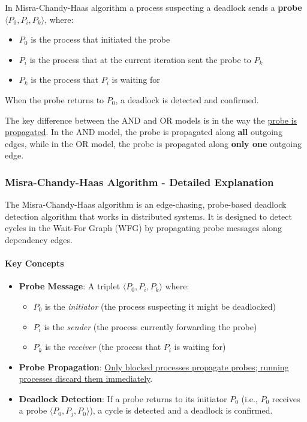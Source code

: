 In Misra-Chandy-Haas algorithm a process suspecting a deadlock sends a \textbf{probe} $\langle P_0,P_i,P_k\rangle$, where:
\begin{itemize}
   \item $P_0$ is the process that initiated the probe
   \item $P_i$ is the process that at the current iteration sent the probe to $P_k$
   \item $P_k$ is the process that $P_i$ is waiting for
\end{itemize}
When the probe returns to $P_0$, a deadlock is detected and confirmed.

The key difference between the AND and OR models is in the way the \ul{probe is propagated}. In the AND model, the probe is propagated along \textbf{all} outgoing edges, while in the OR model, the probe is propagated along \textbf{only one} outgoing edge.

\subsubsection{Misra-Chandy-Haas Algorithm - Detailed Explanation}

The Misra-Chandy-Haas algorithm is an edge-chasing, probe-based deadlock detection algorithm that works in distributed systems. It is designed to detect cycles in the Wait-For Graph (WFG) by propagating probe messages along dependency edges.

\paragraph{Key Concepts}
\begin{itemize}
   \item \textbf{Probe Message}: A triplet $\langle P_0, P_i, P_k \rangle$ where:
   \begin{itemize}
      \item $P_0$ is the \textit{initiator} (the process suspecting it might be deadlocked)
      \item $P_i$ is the \textit{sender} (the process currently forwarding the probe)
      \item $P_k$ is the \textit{receiver} (the process that $P_i$ is waiting for)
   \end{itemize}
   \item \textbf{Probe Propagation}: \ul{Only blocked processes propagate probes; running processes discard them immediately}.
   \item \textbf{Deadlock Detection}: If a probe returns to its initiator $P_0$ (i.e., $P_0$ receives a probe $\langle P_0, P_j, P_0 \rangle$), a cycle is detected and a deadlock is confirmed.
\end{itemize}

